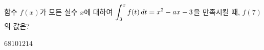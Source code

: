 함수 $f(x)$가 모든 실수 $x$에 대하여 $\displaystyle\int_{3}^{x}f(t)\mkern3mu dt=x^2-ax-3$을 만족시킬 때, $f(7)$의 값은? 
\begin{choices32}{$6$}{$8$}{$10$}{$12$}{$14$}\end{choices32}
